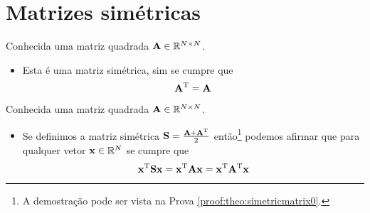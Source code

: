 \section{ Matrizes simétricas}


\begin{definition}\label{def:symmetricmatrix0}
Conhecida uma matriz quadrada $\MATRIX{A} \in \mathbb{R}^{N \times N}$. 
\begin{itemize}
\item Esta é uma matriz simétrica, sim se cumpre que \cite[pp. 18]{golub2013matrix} 
\begin{equation}
\MATRIX{A}^{\transpose} = \MATRIX{A}
\end{equation}
\end{itemize}
\end{definition}

\begin{theorem}\label{theo:simetricmatrix0}
Conhecida uma matriz quadrada $\MATRIX{A} \in \mathbb{R}^{N \times N}$.
\begin{itemize}
\item Se definimos a matriz simétrica $\MATRIX{S}=\frac{\MATRIX{A}+\MATRIX{A}^{\transpose}}{2}$ então\footnote{A
demostração pode ser vista na Prova \ref{proof:theo:simetricmatrix0}.} 
podemos afirmar que para qualquer vetor $\VECTOR{x} \in \mathbb{R}^{N}$ se cumpre que 
\begin{equation}
\VECTOR{x}^{\transpose}\MATRIX{S}\VECTOR{x} = 
\VECTOR{x}^{\transpose}\MATRIX{A}\VECTOR{x} =
\VECTOR{x}^{\transpose}\MATRIX{A}^{\transpose}\VECTOR{x}
\end{equation}
\end{itemize}
\end{theorem}



